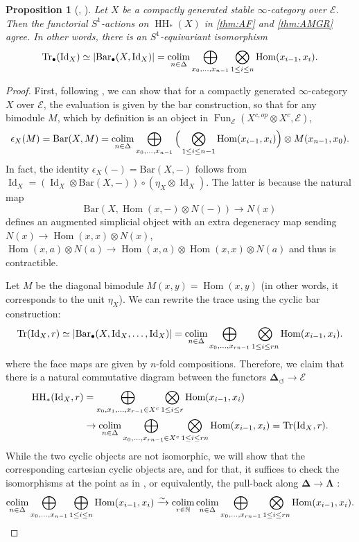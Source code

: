 \documentclass[11pt]{amsart}
\numberwithin{equation}{section}
\theoremstyle{plain}
\newtheorem{Prop}[prop]{Proposition}
\theoremstyle{definition}
\theoremstyle{remark}
\newcommand{\bN} { {\mathbb{N}}}
\newcommand{\cE} { {\mathcal{E}}}
\newcommand{\HOM}{{ \textnormal{Hom}  }}
\newcommand{\Id}{{\operatorname{Id}}}
\newcommand{\colim}{\operatornamewithlimits{colim}}
\newcommand\Fun{\operatorname{Fun}}
\newcommand\HH{\operatorname{HH}}
\newcommand\Tr{\operatorname{Tr}}
\newcommand\Hom{\operatorname{Hom}}
\begin{document}
\begin{Prop}[{\cite[Proposition 4.24]{Hoyois-Scherotzke-Sibilla}, \cite[Proposition B.12]{Ayala-Francis-FH-dim1}}]\label{prop:compare-fh}
    Let $X$ be a compactly generated stable $\infty$-category over $\cE$. Then the functorial $S^1$-actions on $\HH_*(X)$ in \autoref{thm:AF} and \autoref{thm:AMGR} agree. In other words, there is an $S^1$-equivariant isomorphism
    \[\Tr_\bullet(\Id_X) \simeq |\mathrm{Bar}_\bullet(X, \Id_X)| =\operatornamewithlimits{colim}_{n\in \Delta} \bigoplus_{x_0, \dots, x_{n-1}} \bigotimes_{1\leq i\leq n} \HOM(x_{i-1}, x_i).\]
\end{Prop}
\begin{proof}
    First, following \cite[Proposition 4.24]{Hoyois-Scherotzke-Sibilla}, we can show that for a compactly generated $\infty$-category $X$ over $\cE$, the evaluation is given by the bar construction, so that for any bimodule $M$, which by definition is an object in $\Fun_\cE(X^{c,op} \otimes X^{c}, \cE)$,
    \[\epsilon_X(M) = \mathrm{Bar}(X, M) = \colim_{n\in \Delta}\bigoplus_{x_0,\dots,x_{n-1}}\Big(\bigotimes_{1\leq i\leq n-1}\Hom(x_{i-1}, x_i)\Big) \otimes M(x_{n-1}, x_0).\]
    In fact, the identity $\epsilon_X(-) = \mathrm{Bar}(X, -)$ follows from $\Id_X = (\Id_X \otimes \mathrm{Bar}(X, -)) \circ (\eta_X \otimes \Id_X)$. The latter is because the natural map
    \[\mathrm{Bar}(X, \Hom(x, -) \otimes N(-)) \to N(x)\]
    defines an augmented simplicial object with an extra degeneracy map sending $N(x) \to \Hom(x, x) \otimes N(x)$, $\Hom(x, a) \otimes N(a) \to \Hom(x, a) \otimes \Hom(x, x) \otimes N(a)$ and thus is contractible.
    
    Let $M$ be the diagonal bimodule $M(x, y) = \Hom(x, y)$ (in other words, it corresponds to the unit $\eta_X$). We can rewrite the trace using the cyclic bar construction:
    \[\Tr(\Id_X, r) \simeq |\mathrm{Bar}_\bullet(X, \Id_X, \dots, \Id_X)| = \colim_{n\in \Delta}\bigoplus_{x_0,\dots,x_{rn-1}}\bigotimes_{1\leq i\leq rn}\Hom(x_{i-1}, x_i).\]
    where the face maps are given by $n$-fold compositions. Therefore, we claim that there is a natural commutative diagram between the functors $\boldsymbol{\Delta}_{\circlearrowleft} \to \cE$ 
    \begin{align*}
    \HH_*(\Id_X, r)
    &= \bigoplus_{x_0, x_1, \dots, x_{r-1} \in X^c} \bigotimes_{1\leq i\leq r} \HOM(x_{i-1}, x_i)\\
    &\to \colim_{n\in \Delta}\bigoplus_{x_0,\dots,x_{rn-1}\in X^c}\bigotimes_{1\leq i\leq rn}\Hom(x_{i-1}, x_i)= \Tr(\Id_X, r) .
    \end{align*}
    While the two cyclic objects are not isomorphic, we will show that the corresponding cartesian cyclic objects are, and for that, it suffices to check the isomorphisms at the point as in \cite[Proposition 4.24]{Hoyois-Scherotzke-Sibilla}, or equivalently, the pull-back along $\boldsymbol\Delta \to \boldsymbol{\Lambda}$ \cite[Proposition 1.1]{Hoyois}:
    \[\colim_{n\in \Delta}\bigoplus_{x_0,\dots,x_{n-1}}\bigoplus_{1\leq i\leq n}\Hom(x_{i-1},x_i) \xrightarrow{\sim} \colim_{r\in\bN}\colim_{n\in\Delta}\bigoplus_{x_0,\dots,x_{rn-1}}\bigotimes_{1\leq i\leq rn}\Hom(x_{i-1}, x_i).\]
    

\end{proof}
\end{document}
